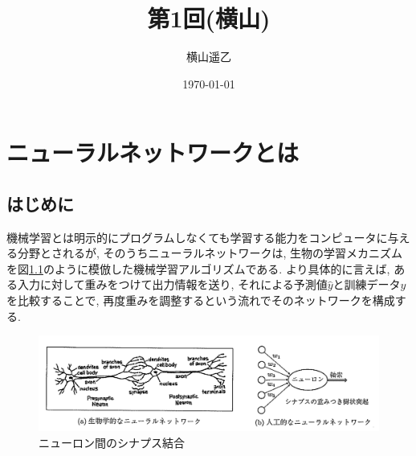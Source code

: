 \documentclass[dvipdfmx,report,11pt]{jsbook}
\title{第1回(横山)}
\author{横山遥乙}
\date{\today}
\begin{document}
\newcommand{\ctext}[1]{\raise0.2ex\hbox{\textcircled{\scriptsize{#1}}}}
\newcommand{\sign}{\operatorname{sign}}



\chapter{ニューラルネットワークとは}
\section{はじめに}
機械学習とは明示的にプログラムしなくても学習する能力をコンピュータに与える分野とされるが, そのうちニューラルネットワークは, 生物の学習メカニズムを図\ref{fig1}のように模倣した機械学習アルゴリズムである. より具体的に言えば, ある入力に対して重みをつけて出力情報を送り, それによる予測値$\hat{y}$と訓練データ$y$を比較することで, 再度重みを調整するという流れでそのネットワークを構成する.
\begin{figure}[H]
  \centering
    \includegraphics[width=0.8\linewidth]{figure/fig1.png}
    \caption{ニューロン間のシナプス結合}
    \label{fig1}
\end{figure}
\end{document}
